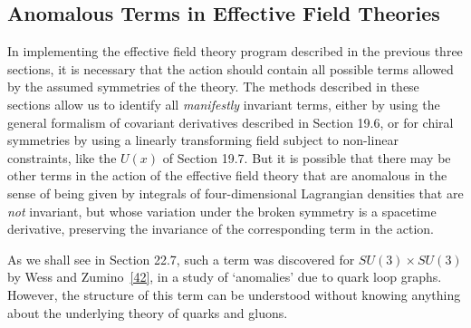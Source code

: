 \subsection[Anomalous Terms in Effective Field Theories]{Anomalous Terms in Effective Field Theories\footnotemark}
\label{sec:19.8}

In implementing the effective field theory program described in the previous three sections, it is necessary that the action should contain all possible terms allowed by the assumed symmetries of the theory. The methods described in these sections allow us to identify all \emph{manifestly} invariant terms, either by using the general formalism of covariant derivatives described in Section 19.6, or for chiral symmetries by using a linearly transforming field subject to non-linear constraints, like the $U(x)$ of Section 19.7. But it is possible that there may be other terms in the action of the effective field theory that are anomalous in the sense of being given by integrals of four-dimensional Lagrangian densities that are \emph{not} invariant, but whose variation under the broken symmetry is a spacetime derivative, preserving the invariance of the corresponding term in the action.

As we shall see in Section 22.7, such a term was discovered for $SU(3)\times SU(3)$ by Wess and Zumino~\hyperref[ch19-ref-42]{[42]}, in a study of `anomalies' due to quark loop graphs. However, the structure of this term can be understood without knowing anything about the underlying theory of quarks and gluons.

